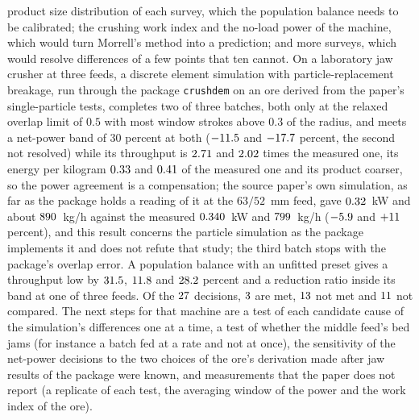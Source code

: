 product size distribution of each survey, which the population balance needs to be calibrated; the crushing work index and the no-load power of the machine,
which would turn Morrell's method into a prediction; and more surveys, which would resolve differences of a few points that ten cannot. On a laboratory jaw crusher at three feeds, a discrete element simulation with particle-replacement breakage, run through the package \texttt{crushdem} on an ore derived from the paper's single-particle tests, completes two of three batches, both only at the relaxed overlap limit of $0.5$ with most window strokes above $0.3$ of the radius, and meets a net-power band of $30$ percent at both ($-11.5$ and $-17.7$ percent, the second not resolved) while its throughput is $2.71$ and $2.02$ times the measured one, its energy per kilogram $0.33$ and $0.41$ of the measured one and its product coarser, so the power agreement is a compensation; the source paper's own simulation, as far as the package holds a reading of it at the $63/52$~mm feed, gave $0.32$~kW and about $890$~kg/h against the measured $0.340$~kW and $799$~kg/h ($-5.9$ and $+11$ percent), and this result concerns the particle simulation as the package implements it and does not refute that study; the third batch stops with the package's overlap error. A population balance with an unfitted preset gives a throughput low by $31.5$, $11.8$ and $28.2$ percent and a reduction ratio inside its band at one of three feeds. Of the $27$ decisions, $3$ are met, $13$ not met and $11$ not compared. The next steps for that machine are a test of each candidate cause of the simulation's differences one at a time, a test of whether the middle feed's bed jams (for instance a batch fed at a rate and not at once), the sensitivity of the net-power decisions to the two choices of the ore's derivation made after jaw results of the package were known, and measurements that the paper does not report (a replicate of each test, the averaging window of the power and the work index of the ore).
